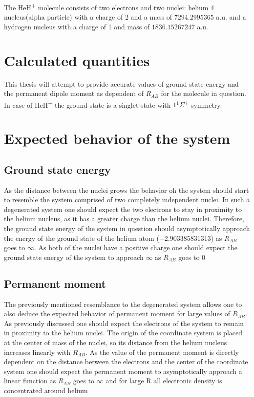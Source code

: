 \documentclass{pracalicmgr}
\begin{document}
The HeH\textsuperscript{+} molecule consists of two electrons and two nuclei:  helium 4 nucleus(alpha particle) with a charge of 2 and a mass of $7294.2995365$ a.u. and a hydrogen nucleus with a charge of 1 and mass of $1836.15267247$ a.u. \cite{SCHWARTZ}

\section{Calculated quantities}

This thesis will attempt to provide accurate values of ground state energy and the permanent dipole moment as dependent of $R_{AB}$ for the molecule in question. In case of HeH\textsuperscript{+} the ground state is a singlet state with $1{}^{1}\Sigma^{+}$ symmetry.

\section{Expected behavior of the system}
\label{expectations}

\subsection{Ground state energy}

As the distance between the nuclei grows the behavior oh the system should start to resemble the system comprised of two  completely independent nuclei. In such a degenerated system one should expect the two electrons to stay in proximity to the helium nucleus, as it has a greater charge than the helium nuclei. Therefore, the ground state energy of the system in question should asymptotically approach the energy of the ground state of the helium atom ($-2.903385831313$)\cite{SCHWARTZ} as $R_{AB}$ goes to $\infty$. As both of the nuclei have a positive charge one should expect the ground state energy of the system to approach $\infty$ as $R_{AB}$ goes to $0$

\subsection{Permanent moment}

The previously mentioned resemblance to the degenerated system allows one to also deduce the expected behavior of permanent moment for large values of $R_{AB}$. As previously discussed one should expect the electrons of the system to remain in proximity to the helium nuclei. The origin of the coordinate system is placed at the center of mass of the nuclei, so its distance from the helium nucleus increases linearly with $R_{AB}$. As the value of the permanent moment is directly dependent on the distance between the electrons and the center of the coordinate system one should expect the permanent moment to asymptotically approach a linear function as $R_{AB}$ goes to $\infty$ and for large R all electronic density is concentrated around helium
\end{document}
